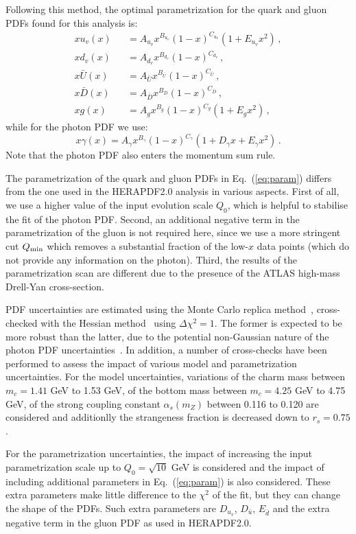 Following this method, the optimal parametrization for the quark and
gluon PDFs found for this analysis is:
\begin{eqnarray}
  \nonumber
  xu_v(x) &&= A_{u_v}x^{B_{u_v}}(1-x)^{C_{u_v}}(1+E_{u_v}x^{2})\, , \\
  \nonumber
xd_v(x) &&= A_{d_v}x^{B_{d_v}}(1-x)^{C_{d_v}}\, , \\
x\bar{U}(x) &&= A_{\bar{U}}x^{B_{\bar{U}}}(1-x)^{C_{\bar{U}}}\, , \\
\nonumber
x\bar{D}(x) &&= A_{\bar{D}}x^{B_{\bar{D}}}(1-x)^{C_{\bar{D}}}\, , \\
\nonumber
\label{eq:param}
xg(x) &&= A_{g}x^{B_{g}}(1-x)^{C_{g}}(1+E_{g}x^{2})\, ,
\end{eqnarray}
while for the photon PDF we use:
\begin{equation}
x\gamma(x) = A_{\gamma}x^{B_{\gamma}}(1-x)^{C_{\gamma}}(1+D_{\gamma}x+E_{\gamma}x^{2}) \, .
\end{equation}
Note that the photon PDF also enters the momentum sum rule.

The parametrization of the quark and gluon PDFs in
Eq.~(\ref{eq:param}) differs from the one used in the HERAPDF2.0
analysis in various aspects.
%
First of all, we use a higher value of the input evolution scale
$Q_0$, which is helpful to stabilise the fit of the photon PDF.
%
Second, an additional negative term in the parametrization of the
gluon is not required here, since we use a more stringent cut
$Q_{\rm min}$ which removes a substantial fraction of the low-$x$ data points (which do
not provide any information on the photon).
%
Third, the results of the parametrization scan are different due to
the presence of the ATLAS high-mass Drell-Yan cross-section.

PDF uncertainties are estimated using the Monte Carlo replica
method~\cite{DelDebbio:2004xtd,DelDebbio:2007ee}, cross-checked with
the Hessian method~\cite{Pumplin:2001ct} using $\Delta\chi^2=1$.
%
The former is expected to be more robust than the latter, due to the
potential non-Gaussian nature of the photon PDF
uncertainties~\cite{Ball:2013hta}.
%
In addition, a number of cross-checks have been performed to assess the
impact of various model and parametrization uncertainties.
%
For the model uncertainties, variations of the charm mass
between $m_c=1.41$ GeV to 1.53 GeV, of the bottom mass between
$m_c=4.25$ GeV to 4.75 GeV, of the strong coupling constant
$\alpha_s(m_Z)$ between 0.116 to 0.120 are considered and additionlly the
strangeness fraction is decreased down to $r_s=0.75$.

For the parametrization uncertainties, the impact
of increasing the input parametrization scale up to $Q_0=\sqrt{10}$ 
GeV is considered and the impact of including additional parameters in Eq.~(\ref{eq:param}) is
also considered. These extra parameters
make little difference to the $\chi^2$ of the fit, but they can
change the shape of the PDFs. Such extra parameters are  $D_{u_v}$, $D_{\bar{u}}$, $E_{\bar{d}}$ and the extra negative term 
in the gluon PDF as used in HERAPDF2.0.
